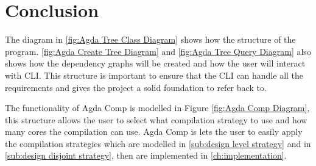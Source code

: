 

\pagebreak

\section{Conclusion}

The diagram in \cref{fig:Agda Tree Class Diagram} shows how the structure of the
program. \cref{fig:Agda Create Tree Diagram} and \cref{fig:Agda Tree Query Diagram} also shows how the dependency graphs will be created and how the user
will interact with CLI. This structure is important to ensure that the
CLI can handle all the requirements and gives the project a solid foundation to
refer back to. 

The functionality of Agda Comp is modelled in Figure \cref{fig:Agda Comp Diagram}, this structure allows the user to select what compilation strategy to
use and how many cores the compilation can use. Agda Comp is lets the user to
easily apply the compilation strategies which are modelled in \cref{sub:design level strategy} and in \cref{sub:design disjoint strategy}, then are
implemented in \cref{ch:implementation}.

%

